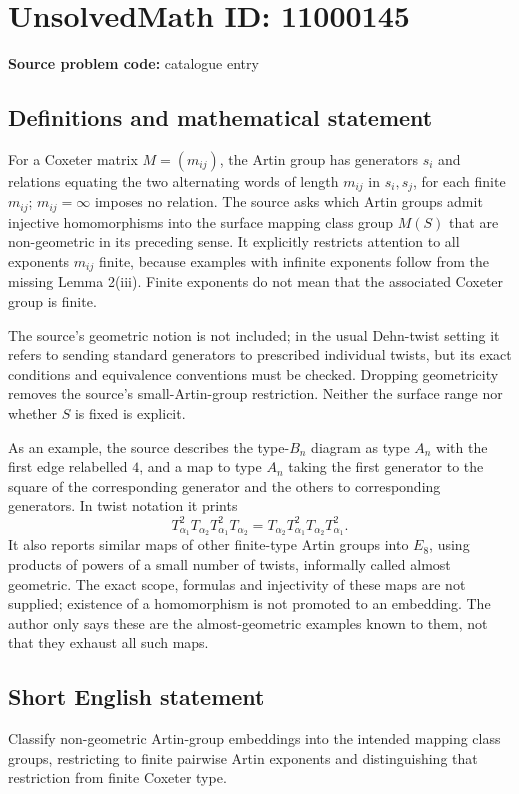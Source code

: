 \documentclass[11pt]{article}
\begin{document}
\section*{UnsolvedMath ID: 11000145}
\textbf{Source problem code:} catalogue entry
\subsection{Definitions and mathematical statement}
For a Coxeter matrix \(M=(m_{ij})\), the Artin group has generators \(s_i\) and relations equating the two alternating words of length \(m_{ij}\) in \(s_i,s_j\), for each finite \(m_{ij}\); \(m_{ij}=\infty\) imposes no relation. The source asks which Artin groups admit injective homomorphisms into the surface mapping class group \(M(S)\) that are non-geometric in its preceding sense. It explicitly restricts attention to all exponents \(m_{ij}\) finite, because examples with infinite exponents follow from the missing Lemma 2(iii). Finite exponents do not mean that the associated Coxeter group is finite.

The source's geometric notion is not included; in the usual Dehn-twist setting it refers to sending standard generators to prescribed individual twists, but its exact conditions and equivalence conventions must be checked. Dropping geometricity removes the source's small-Artin-group restriction. Neither the surface range nor whether \(S\) is fixed is explicit.

As an example, the source describes the type-\(B_n\) diagram as type \(A_n\) with the first edge relabelled \(4\), and a map to type \(A_n\) taking the first generator to the square of the corresponding generator and the others to corresponding generators. In twist notation it prints
\[
 T_{\alpha_1}^2T_{\alpha_2}T_{\alpha_1}^2T_{\alpha_2}
 =T_{\alpha_2}T_{\alpha_1}^2T_{\alpha_2}T_{\alpha_1}^2.
\]
It also reports similar maps of other finite-type Artin groups into \(E_8\), using products of powers of a small number of twists, informally called almost geometric. The exact scope, formulas and injectivity of these maps are not supplied; existence of a homomorphism is not promoted to an embedding. The author only says these are the almost-geometric examples known to them, not that they exhaust all such maps.
\subsection{Short English statement}
Classify non-geometric Artin-group embeddings into the intended mapping class groups, restricting to finite pairwise Artin exponents and distinguishing that restriction from finite Coxeter type.
\end{document}
